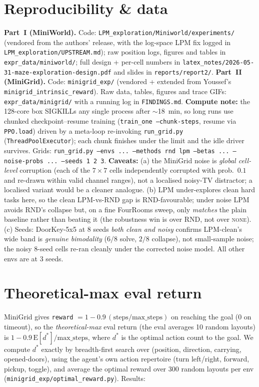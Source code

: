 \documentclass[11pt]{article}
\begin{document}
\section{Reproducibility \& data}
\textbf{Part~I (MiniWorld).} Code: \texttt{LPM\_exploration/Miniworld/experiments/} (vendored from the
authors' release, with the log-space LPM fix logged in \texttt{LPM\_exploration/UPSTREAM.md}); raw
position logs, figures and tables in \texttt{expr\_data/miniworld/}; full design + per-cell numbers in
\texttt{latex\_notes/2026-05-31-maze-exploration-design.pdf} and slides in
\texttt{reports/report2/}. \textbf{Part~II (MiniGrid).} Code: \texttt{minigrid\_exp/} (vendored +
extended from Youssef's \texttt{minigrid\_intrinsic\_reward}). Raw data, tables, figures and trace
GIFs: \texttt{expr\_data/minigrid/} with a running log in \texttt{FINDINGS.md}.
\textbf{Compute note:} the 128-core box SIGKILLs any single process after $\sim$18~min, so long runs
use chunked checkpoint--resume training (\texttt{train\_one --chunk-steps}, resume via
\texttt{PPO.load}) driven by a meta-loop re-invoking \texttt{run\_grid.py} (\texttt{ThreadPoolExecutor});
each chunk finishes under the limit and the idle driver survives. Grids:
\texttt{run\_grid.py --envs ... --methods rnd lpm --betas ... --noise-probs ... --seeds 1 2 3}.
\textbf{Caveats:} (a) the MiniGrid noise is \emph{global cell-level} corruption (each of the
$7\!\times\!7$ cells independently corrupted with prob.\ $0.1$ and re-drawn within valid channel
ranges), not a localised noisy-TV distractor; a localised variant would be a cleaner analogue. (b) LPM under-explores clean
hard tasks here, so the clean LPM-vs-RND gap is RND-favourable; under noise LPM avoids RND's collapse
but, on a fine FourRooms sweep, only \emph{matches} the plain baseline rather than beating it (the
robustness win is over RND, not over \textsc{none}). (c) Seeds: DoorKey-5x5 at 8 seeds \emph{both clean and noisy} confirms LPM-clean's wide band is
\emph{genuine bimodality} ($6/8$ solve, $2/8$ collapse), not small-sample noise; the noisy 8-seed cells
re-ran cleanly under the corrected noise model. All other envs are at 3 seeds.

\section{Theoretical-max eval return}\label{sec:optmax}
MiniGrid gives \texttt{reward} $= 1 - 0.9\,(\text{steps}/\text{max\_steps})$ on reaching the goal (0 on
timeout), so the \emph{theoretical-max} eval return (the eval averages 10 random layouts) is
$1 - 0.9\,\mathrm{E}[d^{*}]/\text{max\_steps}$, where $d^{*}$ is the optimal action count to the goal. We
compute $d^{*}$ exactly by breadth-first search over (position, direction, carrying, opened-doors), using
the agent's own action repertoire (turn left/right, forward, pickup, toggle), and average the optimal
reward over $300$ random layouts per env (\texttt{minigrid\_exp/optimal\_reward.py}). Results:
\end{document}
